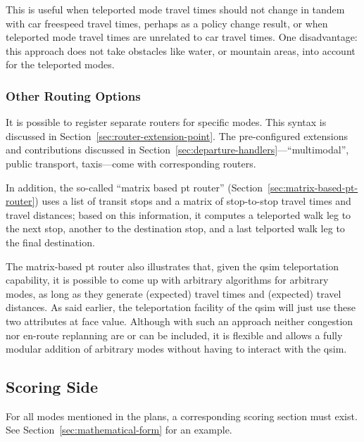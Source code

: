 This is useful when teleported mode travel times should not change in tandem with car freespeed travel times, perhaps as a policy change result, or when teleported mode travel times are unrelated to car travel times.  One disadvantage: this approach does not take obstacles like water, or mountain areas, into account for the teleported modes.

\subsubsection{Other Routing Options}
It is possible to register separate routers for specific modes.  This syntax is discussed in Section~\ref{sec:router-extension-point}.  The pre-configured extensions and contributions discussed in Section~\ref{sec:departure-handlers}---``multimodal'', public transport, taxis---come with corresponding routers.  

In addition, the so-called ``matrix based pt router'' (Section~\ref{sec:matrix-based-pt-router}) uses a list of transit stops and a matrix of stop-to-stop travel times and travel distances; based on this information, it computes a teleported walk leg to the next stop, another to the destination stop, and a last telported walk leg to the final destination.

The matrix-based pt router also illustrates that, given the \gls{qsim} teleportation capability, it is possible to come up with arbitrary algorithms for arbitrary modes, as long as they generate (expected) travel times and (expected) travel distances.  As said earlier, the \gls{teleportation} facility of the \gls{qsim} will just use these two attributes at face value.  Although with such an approach neither congestion nor en-route replanning are or can be included, it is flexible and allows a fully modular addition of arbitrary modes without having to interact with the \gls{qsim}.

\subsection{Scoring Side}
For all modes mentioned in the plans, a corresponding scoring section must exist.  See Section~\ref{sec:mathematical-form} for an example.

